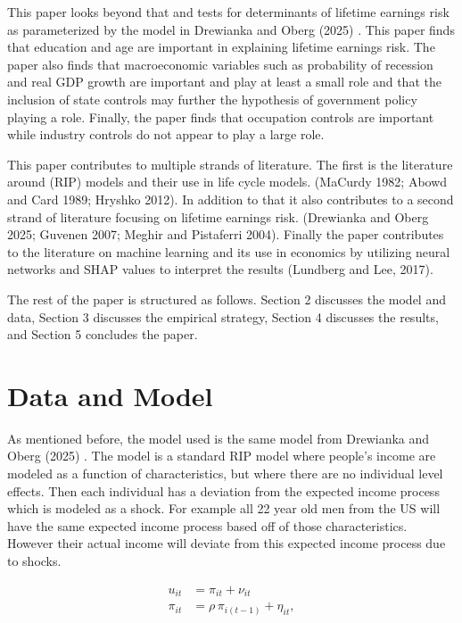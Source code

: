 \documentclass[12pt]{article}
\begin{document}
\begin{onehalfspace}
This paper looks beyond that and tests for determinants of lifetime earnings risk as parameterized by the model in Drewianka and Oberg (2025) \cite{drewianka2025}. This paper finds that education and age are important in explaining lifetime earnings risk. The paper also finds that macroeconomic variables such as probability of recession and real GDP growth are important and play at least a small role and that the inclusion of state controls may further the hypothesis of government policy playing a role. Finally, the paper finds that occupation controls are important while industry controls do not appear to play a large role.



This paper contributes to multiple strands of literature. The first is the literature around (RIP) models and their use in life cycle models. (MaCurdy 1982; Abowd and Card 1989; Hryshko 2012). \cite{macurdy1982, abowd_card1989, hryshko2012} In addition to that it also contributes to a second strand of literature focusing on lifetime earnings risk. (Drewianka and Oberg 2025; Guvenen 2007; Meghir and Pistaferri 2004). \cite{drewianka2025,guvenen2007,meghir_pistaferri2004} Finally the paper contributes to the literature on machine learning and its use in economics by utilizing neural networks and SHAP values to interpret the results (Lundberg and Lee, 2017). \cite{lundberq} 

The rest of the paper is structured as follows. Section 2 discusses the model and data, Section 3 discusses the empirical strategy, Section 4 discusses the results, and Section 5 concludes the paper. 

\section{Data and Model}

As mentioned before, the model used is the same model from Drewianka and Oberg (2025) \cite{drewianka2025}. The model is a standard RIP model where people's income are modeled as a function of characteristics, but where there are no individual level effects. Then each individual has a deviation from the expected income process which is modeled as a shock. For example all 22 year old men from the US will have the same expected income process based off of those characteristics. However their actual income will deviate from this expected income process due to shocks. 

\begin{align}
u_{it} 
&= \pi_{it} + \nu_{it} \\[1ex]
\pi_{it} 
&= \rho\,\pi_{i(t-1)} + \eta_{it},
\end{align}


\end{onehalfspace}
\end{document}
